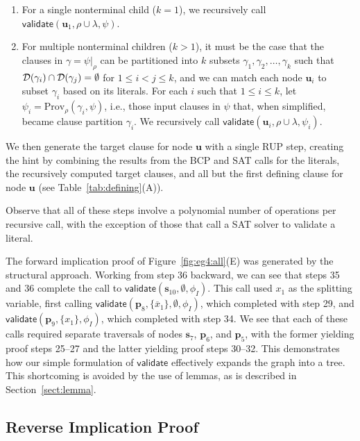 \documentclass[twoside,11pt]{article}
\newcommand{\obar}[1]{\overline{#1}}
\newcommand{\dependencyset}{{\cal D}}
\newcommand{\passign}{\rho}
\newcommand{\validate}{\textsf{validate}}
\newcommand{\prov}{\textrm{Prov}}
\newcommand{\makenode}[1]{\mathbf{#1}}
\newcommand{\nodeu}{\makenode{u}}
\newcommand{\nodes}{\makenode{s}}
\newcommand{\nodep}{\makenode{p}}
\newcommand{\simplify}[2]{#1|_{#2}}
\begin{document}
\begin{enumerate}
\begin{enumerate}
\item For a single nonterminal child ($k = 1$), we recursively call
  $\validate \left(\nodeu_1, \passign \cup \lambda, \psi\right)$.
\item For multiple nonterminal children ($k > 1$),
  it must be the case that the clauses in
  $\gamma = \simplify{\psi}{\passign}$ can be partitioned into $k$ subsets
  $\gamma_1, \gamma_2, \ldots, \gamma_k$ such that $\dependencyset(\gamma_i)
  \cap \dependencyset(\gamma_j) = \emptyset$ for $1 \leq i < j \leq k$,
  and we can match each node $\nodeu_i$ to subset $\gamma_i$ based on its
  literals.
  For each $i$ such that $1 \leq i \leq k$, let $\psi_i = \prov_{\passign}(\gamma_i, \psi)$, i.e., those input clauses in $\psi$ that, when simplified, became clause partition $\gamma_i$.
  We recursively call
  $\validate \left(\nodeu_i, \passign \cup \lambda, \psi_i\right)$.
\end{enumerate}
  We then generate the target clause for node $\nodeu$ with a single RUP step,
creating the hint by combining the results from the BCP and SAT calls for
  the literals, the recursively computed target clauses, and all but
  the first defining clause for node $\nodeu$
(see Table~\ref{tab:defining}(A)).
\end{enumerate}
Observe that
all of these steps involve a polynomial number of
operations per recursive call, with the exception of those that call
a SAT solver to validate a literal.

The forward implication proof of Figure~\ref{fig:eg4:all}(E) was
generated by the structural approach.  Working from step 36 backward,
we can see that steps 35 and 36 complete the call to
$\validate(\nodes_{10}, \emptyset, \phi_I)$.  This call used $x_1$ as
the splitting variable, first calling $\validate(\nodep_{8},
\{\obar{x}_1\}, \emptyset, \phi_I)$, which completed with step 29, and
$\validate(\nodep_{9}, \{x_1\}, \phi_I)$, which completed with step
34.  We see that each of these calls required separate traversals of
nodes $\nodes_7$, $\nodep_6$, and $\nodep_5$, with the former yielding
proof steps 25--27 and the latter yielding proof steps 30--32.  This
demonstrates how our simple formulation of $\validate$ effectively
expands the graph into a tree.  This shortcoming is avoided by the use of lemmas, as is described in Section~\ref{sect:lemma}.

\subsection{Reverse Implication Proof}
\end{document}
